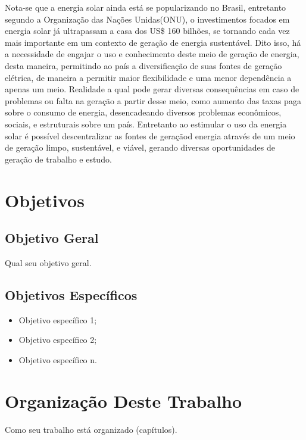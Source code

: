 \indent	Nota-se que a energia solar ainda está se popularizando no Brasil, entretanto segundo a Organização das Nações Unidas(ONU), o investimentos focados em energia solar já ultrapassam a casa dos US\$ 160 bilhões, se tornando cada vez mais importante em um contexto de geração de energia sustentável. Dito isso, há a necessidade de engajar o uso e conhecimento deste meio de geração de energia, desta maneira, permitindo ao país a diversificação de suas fontes de geração elétrica, de maneira a permitir maior flexibilidade e uma menor dependência a apenas um meio. 
\indent	Realidade a qual pode gerar diversas consequências em caso de problemas ou falta na geração a partir desse meio, como aumento das taxas paga sobre o consumo de energia, desencadeando diversos problemas econômicos, sociais, e estruturais sobre um país. Entretanto ao estimular o uso da energia solar é possível descentralizar as fontes de geraçãod energia através de um meio de geração limpo, sustentável, e viável, gerando diversas oportunidades de geração de trabalho e estudo.
\indent 


\section{Objetivos}

\subsection{Objetivo Geral}

Qual seu objetivo geral.

\subsection{Objetivos Específicos}
\begin{itemize}
	\item Objetivo específico 1;
	\item Objetivo específico 2;
	\item Objetivo específico n.
\end{itemize}



\section{Organização Deste Trabalho}

Como seu trabalho está organizado (capítulos).
